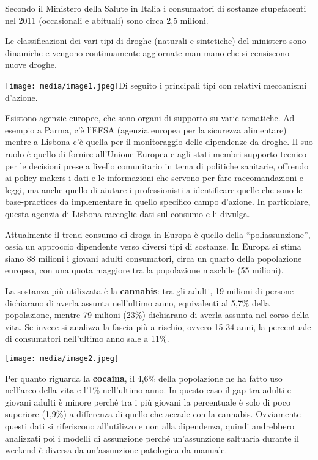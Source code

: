 \documentclass[]{article}
\begin{document}
Secondo il Ministero della Salute in Italia i consumatori di sostanze
stupefacenti nel 2011 (occasionali e abituali) sono circa 2,5 milioni.

Le classificazioni dei vari tipi di droghe (naturali e sintetiche) del
ministero sono dinamiche e vengono continuamente aggiornate man mano che
si censiscono nuove droghe.

\texttt{[image: media/image1.jpeg]}Di seguito i principali tipi con
relativi meccanismi d'azione.

Esistono agenzie europee, che sono organi di supporto su varie
tematiche. Ad esempio a Parma, c'è l'EFSA (agenzia europea per la
sicurezza alimentare) mentre a Lisbona c'è quella per il monitoraggio
delle dipendenze da droghe. Il suo ruolo è quello di fornire all'Unione
Europea e agli stati membri supporto tecnico per le decisioni prese a
livello comunitario in tema di politiche sanitarie, offrendo ai
policy-makers i dati e le informazioni che servono per fare
raccomandazioni e leggi, ma anche quello di aiutare i professionisti a
identificare quelle che sono le base-practices da implementare in quello
specifico campo d'azione. In particolare, questa agenzia di Lisbona
raccoglie dati sul consumo e li divulga.

Attualmente il trend consumo di droga in Europa è quello della
``poliassunzione'', ossia un approccio dipendente verso diversi tipi di
sostanze. In Europa si stima siano 88 milioni i giovani adulti
consumatori, circa un quarto della popolazione europea, con una quota
maggiore tra la popolazione maschile (55 milioni).

La sostanza più utilizzata è la \textbf{cannabis}: tra gli adulti, 19
milioni di persone dichiarano di averla assunta nell'ultimo anno,
equivalenti al 5,7\% della popolazione, mentre 79 milioni (23\%)
dichiarano di averla assunta nel corso della vita. Se invece si analizza
la fascia più a rischio, ovvero 15-34 anni, la percentuale di
consumatori nell'ultimo anno sale a 11\%.

\texttt{[image: media/image2.jpeg]}

Per quanto riguarda la \textbf{cocaina}, il 4,6\% della popolazione ne
ha fatto uso nell'arco della vita e l'1\% nell'ultimo anno. In questo
caso il gap tra adulti e giovani adulti è minore perché tra i più
giovani la percentuale è solo di poco superiore (1,9\%) a differenza di
quello che accade con la cannabis. Ovviamente questi dati si riferiscono
all'utilizzo e non alla dipendenza, quindi andrebbero analizzati poi i
modelli di assunzione perché un'assunzione saltuaria durante il weekend
è diversa da un'assunzione patologica da manuale.
\end{document}
